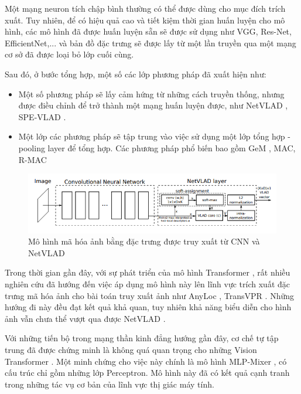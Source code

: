 Một mạng neuron tích chập bình thường có thể được dùng cho mục đích trích xuất. Tuy nhiên, để có hiệu quả cao và tiết kiệm thời gian huấn luyện cho mô hình, các mô hình đã được huấn luyện sẵn sẽ được sử dụng như VGG, Res-Net, EfficientNet,... và bản đồ đặc trưng sẽ được lấy từ một lần truyền qua một mạng cơ sở đã được loại bỏ lớp cuối cùng.

Sau đó, ở bước tổng hợp, một số các lớp phương pháp đã xuất hiện như:
\begin{itemize}
  \item Một số phương pháp sẽ lấy cảm hứng từ những cách truyền thống, nhưng được điều chỉnh để trở thành một mạng huấn luyện được, như NetVLAD \cite{arandjelovic2016netvlad}, SPE-VLAD \cite{yu2019spatial}.
  \item Một lớp các phương pháp sẽ tập trung vào việc sử dụng một lớp tổng hợp - pooling layer để tổng hợp. Các phương pháp phổ biến bao gồm GeM \cite{radenovic2018fine}, MAC, R-MAC \cite{tolias2015particular}
\end{itemize}

\begin{figure}[H]
  \centering
  \includegraphics[scale=0.8]{pics/Chapter3/netvlad.png}
  \caption{Mô hình mã hóa ảnh bằng đặc trưng được truy xuất từ CNN và  NetVLAD \cite{arandjelovic2016netvlad}}
  \label{fig:enter-label}
\end{figure}

Trong thời gian gần đây, với sự phát triển của mô hình Transformer \cite{vaswani2023attention}, rất nhiều nghiên cứu đã hướng đến việc áp dụng mô hình này lên lĩnh vực trích xuất đặc trưng mã hóa ảnh cho bài toán truy xuất ảnh như AnyLoc \cite{keetha2023anyloc}, TransVPR \cite{wang2022transvpr}. Những hướng đi này đều đạt kết quả khả quan, tuy nhiên khả năng biểu diễn cho hình ảnh vẫn chưa thể vượt qua được NetVLAD \cite{alibey2023mixvpr}.

Với những tiến bộ trong mạng thần kinh đẳng hướng gần đây, cơ chế tự tập trung đã được chứng minh là không quá quan trọng cho những Vision Transformer \cite{dosovitskiy2021image}. Một minh chứng cho việc này chính là mô hình MLP-Mixer \cite{tolstikhin2021mlpmixer}, có cấu trúc chỉ gồm những lớp Perceptron. Mô hình này đã có kết quả cạnh tranh trong những tác vụ cơ bản của lĩnh vực thị giác máy tính.


